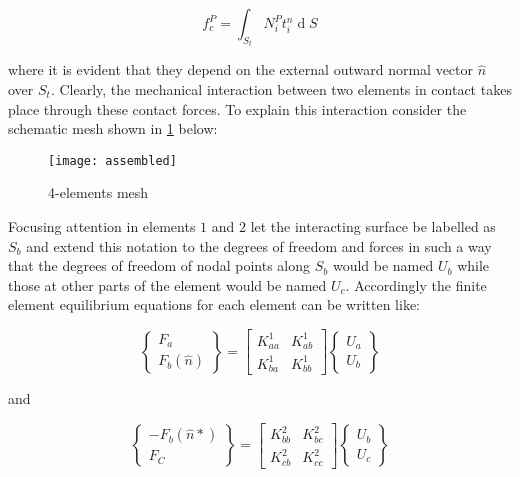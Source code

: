 \begin{equation}
f_c^P=\int_{S_t}N_i^Pt_i^n\operatorname dS
\label{traction}
\end{equation}

where it is evident that they depend on the external outward normal vector $\widehat n$ over $S_t$. Clearly, the mechanical interaction between two elements in contact takes place through these contact forces. To explain this interaction consider the schematic mesh shown in \cref{fig:4assembled1} below:


\begin{figure}[H]
\centering
\texttt{[image: assembled]}
\caption{4-elements mesh}
\label{fig:4assembled1}
\end{figure}


Focusing attention in elements $1$ and $2$ let the interacting surface be labelled as $S_b$ and extend this notation to the degrees of freedom and forces in such a way that the degrees of freedom of nodal points along $S_b$ would be named $U_b$ while those at other parts of the element would be named $U_c$. Accordingly the finite element equilibrium equations for each element can be written like:

\begin{equation}
\begin{Bmatrix}F_a\\F_b(\widehat n)\end{Bmatrix} = \begin{bmatrix}K_{aa}^1&K_{ab}^1\\K_{ba}^1&K_{bb}^1\end{bmatrix}\begin{Bmatrix}U_a\\U_b\end{Bmatrix}
\end{equation}

and

\begin{equation}
\begin{Bmatrix}-F_b(\widehat n\ast)\\F_C\end{Bmatrix}=\begin{bmatrix}K_{bb}^2&K_{bc}^2\\K_{cb}^2&K_{cc}^2\end{bmatrix}\begin{Bmatrix}U_b\\U_c\end{Bmatrix}
\end{equation}


